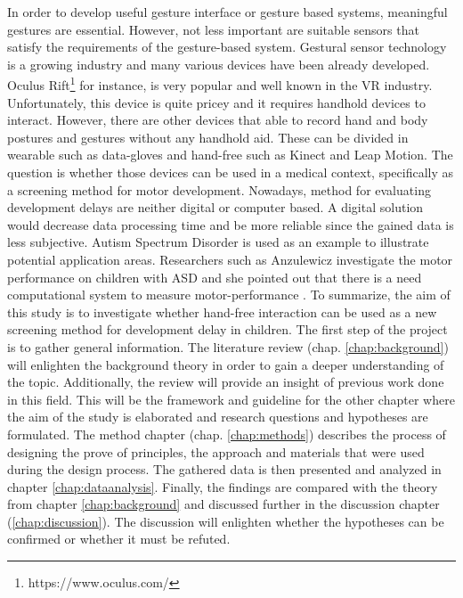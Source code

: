 In order to develop useful gesture interface or gesture based systems, meaningful gestures are essential. However, not less important are suitable sensors that satisfy the requirements of the gesture-based system.
Gestural sensor technology is a growing industry and many various devices have been already developed. Oculus Rift\footnote{https://www.oculus.com/} for instance, is very popular and well known in the VR industry. Unfortunately, this device is quite pricey and it requires handhold devices to interact. However, there are other devices that able to record hand and body postures and gestures without any handhold aid.
These can be divided in wearable such as data-gloves \cite{Gupta2001} and hand-free such as Kinect and Leap Motion.
The question is whether those devices can be used in a medical context, specifically as a screening method for motor development. Nowadays, method for evaluating development delays are neither digital or computer based. A digital solution would decrease data processing time and be more reliable since the gained data is less subjective. Autism Spectrum Disorder is used as an example to illustrate potential application areas. Researchers such as Anzulewicz investigate the motor performance on children with ASD and she pointed out that there is a need computational system to measure motor-performance \cite{Anzulewicz2016}. 
\newline
To summarize, the aim of this study is to investigate whether hand-free interaction can be used as a new screening method for development delay in children.
\newline
The first step of the project is to gather general information. The literature review (chap. \ref{chap:background}) will enlighten the background theory in order to gain a deeper understanding of the topic. Additionally, the review will provide an insight of previous work done in this field. This will be the framework and guideline for the other chapter where the aim of the study is elaborated and research questions and hypotheses are formulated. The method chapter (chap. \ref{chap:methods}) describes the process of designing the prove of principles, the approach and materials that were used during the design process. The gathered data is then presented and analyzed in chapter \ref{chap:dataanalysis}. Finally, the findings are compared with the theory from chapter \ref{chap:background} and discussed further in the discussion chapter (\ref{chap:discussion}). The discussion will enlighten whether the hypotheses can be confirmed or whether it must be refuted.


